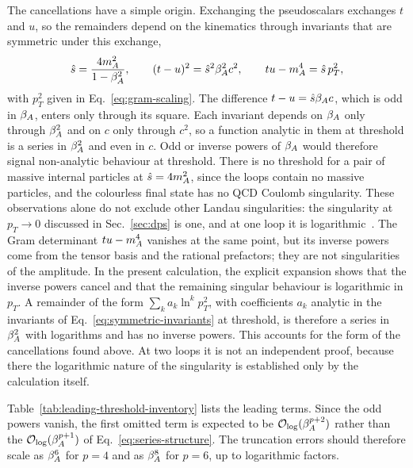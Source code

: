 The cancellations have a simple origin. Exchanging the pseudoscalars
exchanges $t$ and $u$, so the remainders depend on the kinematics through
invariants that are symmetric under this exchange,
\begin{equation}
 \hat s=\frac{4m_A^2}{1-\beta_A^2},\qquad
 (t-u)^2=\hat s^2\beta_A^2c^2,\qquad
 tu-m_A^4=\hat s\,p_T^2,
 \label{eq:symmetric-invariants}
\end{equation}
with $p_T^2$ given in Eq.~\eqref{eq:gram-scaling}. The difference
$t-u=\hat s\beta_A c$, which is odd in $\beta_A$, enters only through its square.
Each invariant depends on $\beta_A$ only through $\beta_A^2$ and on $c$ only
through $c^2$, so a function analytic in them at threshold is a series in
$\beta_A^2$ and even in $c$. Odd or inverse powers of $\beta_A$ would therefore signal
non-analytic behaviour at threshold. There is no threshold for a pair of
massive internal particles at $\hat s=4m_A^2$, since the loops contain no
massive particles, and the colourless final state has no QCD Coulomb
singularity. These observations alone do not exclude other Landau
singularities: the singularity at $p_T\to0$ discussed in Sec.~\ref{sec:dps}
is one, and at one loop it is logarithmic~\cite{BDFS2011,BDFS2012,GauntStirling2011}. The Gram
determinant $tu-m_A^4$ vanishes at the same point, but its inverse powers come
from the tensor basis and the rational prefactors; they are not singularities
of the amplitude. In the present calculation, the explicit expansion shows
that the inverse powers cancel and that the remaining singular behaviour is
logarithmic in $p_T$.
A remainder of the form $\sum_k a_k\ln^k p_T^2$, with coefficients $a_k$
analytic in the invariants of Eq.~\eqref{eq:symmetric-invariants} at
threshold, is therefore a series in $\beta_A^2$ with logarithms and has no
inverse powers. This accounts for the form of the cancellations found above.
At two loops it is not an independent proof, because there the logarithmic
nature of the singularity is established only by the calculation itself.

Table~\ref{tab:leading-threshold-inventory} lists the leading terms. Since
the odd powers vanish, the first omitted term is expected to be
$\mathcal{O}_{\log}(\beta_A^{p+2})$ rather than the $\mathcal{O}_{\log}(\beta_A^{p+1})$ of
Eq.~\eqref{eq:series-structure}. The truncation errors should therefore
scale as $\beta_A^6$ for $p=4$ and as $\beta_A^8$ for $p=6$, up to logarithmic
factors.




